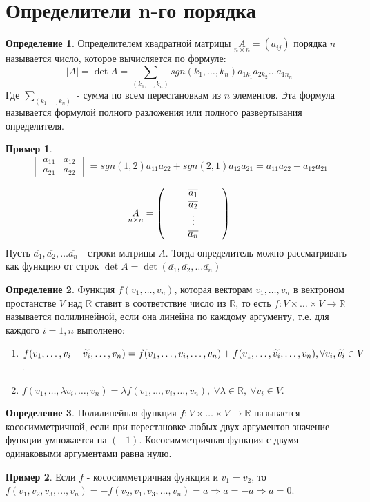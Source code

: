 \documentclass[a4paper, 12pt]{article}
\newcommand{\R}{\mathbb R}
\newcommand\tab[1][.5cm]{\hspace*{#1}}
\theoremstyle{definition}
\newtheorem*{definition}{Определение}
\newtheorem*{example1}{Пример}
\begin{document}
  \section{Определители n-го порядка}
  \begin{definition}
    Определителем квадратной матрицы $\underset{n \times n}{A}=(a_{ij})$ порядка $n$ называется число, которое вычисляется по формуле:
    $$|A|=\det{A}=\sum\limits_{(k_1,\dots,k_n)}sgn(k_1,\dots,k_n)a_{1k_1}a_{2k_2}\dots a_{1n_n}$$
    Где $\sum\limits_{(k_1,\dots,k_n)}$ - сумма по всем перестановкам из $n$ элементов. Эта формула называется формулой полного разложения или полного развертывания определителя.
  \end{definition}
  \begin{example1}
    $$\begin{vmatrix}
      a_{11} & a_{12}\\
      a_{21} & a_{22}  
    \end{vmatrix} = sgn(1,2)a_{11}a_{22}+sgn(2,1)a_{12}a_{21}=a_{11}a_{22}-a_{12}a_{21}$$
  \end{example1}
  $$\underset{n \times n}{A}=\begin{pmatrix}
    \tab & \overline{a_1} & \tab\\
    \null & \overline{a_2} & \null\\
    \null & \vdots & \null\\
    \null & \overline{a_n} & \null
  \end{pmatrix}$$
  Пусть $\overline{a_1}, \overline{a_2}, \dots \overline{a_n}$ - строки матрицы $A$. Тогда определитель можно рассматривать как функцию от строк $\det{A}=\det{(\overline{a_1},\overline{a_2},\dots \overline{a_n})}$
  \begin{definition}
    Функция $f(v_1,\dots, v_n)$, которая векторам $v_1,\dots, v_n$ в вектроном простанстве $V$ над $\R$ ставит в соответствие число из $\R$, то есть $f:V\times\dots\times V\to \R$
    называется полилинейной, если она линейна по каждому аргументу, т.е. для каждого $i=\overline{1,n}$ выполнено:
    \begin{enumerate}
      \item $f(v_1,\dots, v_i+\widetilde{v_i},\dots, v_n)=f(v_1,\dots, v_i,\dots, v_n)+f(v_1,\dots, \widetilde{v_i},\dots, v_n),\\ \forall v_i, \widetilde{v_i}\in V$.
      \item $f(v_1,\dots, \lambda v_i,\dots, v_n)=\lambda f(v_1,\dots, v_i,\dots, v_n),\ \forall \lambda\in \R,\ \forall v_i\in V$.
    \end{enumerate}
  \end{definition}
  \begin{definition}
      Полилинейная функция $f:V\times\dots\times V\to \R$ называется кососимметричной, если при перестановке любых двух аргументов значение функции умножается на $(-1)$. Кососимметричная функция с двумя одинаковыми аргументами равна нулю.
  \end{definition}
  \begin{example1}
    Если $f$ - кососимметричная функция и $v_1=v_2$, то\\
    $f(v_1,v_2,v_3,\dots, v_n)=-f(v_2,v_1,v_3,\dots, v_n)=a \Longrightarrow a=-a \Longrightarrow a=0$.
  \end{example1}
\end{document}
